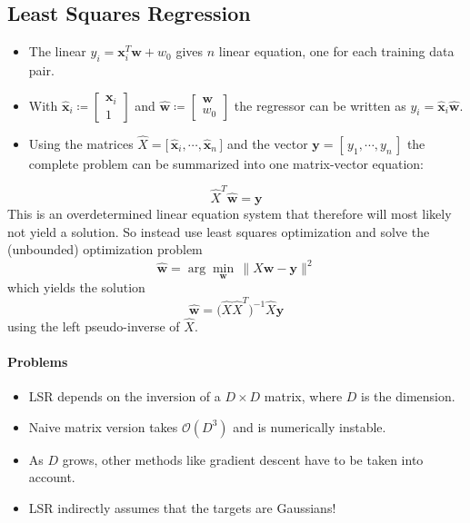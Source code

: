 \documentclass[a4paper, 11pt, accentcolor = tud3b]{tudreport}
\renewcommand{\vec}[1]{\mathbf{#1}}
\begin{document}
			\subsection{Least Squares Regression}
				\begin{itemize}
					\item The linear \( y_i = \vec{x}_i^T \vec{w} + w_0 \) gives \(n\) linear equation, one for each training data pair.
					\item With \( \hat{\vec{x}}_i \coloneqq \begin{bmatrix} \vec{x}_i \\ 1 \end{bmatrix} \) and \( \hat{\vec{w}} \coloneqq \begin{bmatrix} \vec{w} \\ w_0 \end{bmatrix} \) the regressor can be written as \( y_i = \hat{\vec{x}}_i \hat{\vec{w}} \).
					\item Using the matrices \( \hat{X} = \big[\, \hat{\vec{x}}_i, \cdots, \hat{\vec{x}}_n \,\big] \) and the vector \( \vec{y} = [\, y_1, \cdots, y_n \,] \) the complete problem can be summarized into one matrix-vector equation:
				\end{itemize}
				\begin{equation}
					\hat{X}^T \hat{\vec{w}} = \vec{y}
				\end{equation}
				This is an overdetermined linear equation system that therefore will most likely not yield a solution. So instead use least squares optimization and solve the (unbounded) optimization problem
				\begin{equation}
					\hat{\vec{w}} = \arg\min\limits_{\vec{w}} \, \big\lVert \hat{X} \vec{w} - \vec{y} \big\rVert^2
				\end{equation}
				which yields the solution
				\begin{equation}
					\hat{\vec{w}} = \Big( \hat{X} \hat{X}^T \Big)^{-1} \hat{X} \vec{y}
				\end{equation}
				using the left pseudo-inverse of \(\hat{X}\).

				\paragraph{Problems}
					\begin{itemize}
						\item LSR depends on the inversion of a \( D \times D \) matrix, where \(D\) is the dimension.
						\item Naive matrix version takes \( \mathcal{O}(D^3) \) and is numerically instable.
						\item As \(D\) grows, other methods like gradient descent have to be taken into account.
						\item LSR indirectly assumes that the targets are Gaussians!
					\end{itemize}
\end{document}
